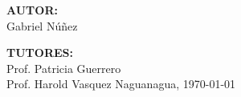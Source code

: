 \begin{titlepage}
	\begin{center}
	\membrete
	\vfill
	\titulo
	\vfill
	\textbf{AUTOR:}\\
	Gabriel N\'{u}\~{n}ez

	\textbf{TUTORES:} \\
	Prof. Patricia Guerrero \\
	Prof. Harold Vasquez
	\vfill
	Naguanagua, \today
	\end{center}
\end{titlepage}